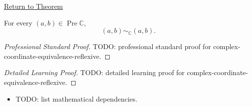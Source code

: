 \newpage
{}
\label{prf:complex-coordinate-equivalence-reflexive}

\begin{remark*}[Return]
\hyperref[lem:complex-coordinate-equivalence-reflexive]{Return to Theorem}
\end{remark*}

\begin{lemma*}
For every $(a,b)\in\operatorname{Pre}\mathbb{C}$,
\[
(a,b)\sim_{\mathbb{C}}(a,b).
\]
\end{lemma*}

\begin{proof}[Professional Standard Proof]
\LRAProofBodyStart
TODO: professional standard proof for complex-coordinate-equivalence-reflexive.
\end{proof}

\begin{proof}[Detailed Learning Proof]
\LRAProofBodyStart
TODO: detailed learning proof for complex-coordinate-equivalence-reflexive.
\end{proof}

\begin{remark*}
\end{remark*}

\begin{dependencies}
\begin{itemize}
  \item TODO: list mathematical dependencies.
\end{itemize}
\end{dependencies}

\clearpage
